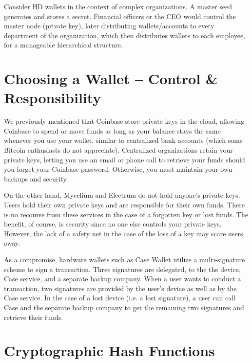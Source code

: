 \documentclass[11pt]{article}
\begin{document}
   Consider HD wallets in the context of complex organizations. A master seed generates and stores a secret. Financial officers or the CEO would control the master node (private key), later distributing wallets/accounts to every department of the organization, which then distributes wallets to each employee, for a manageable hierarchical structure.
   
   \section*{Choosing a Wallet -- Control \& Responsibility}
    
   We previously mentioned that Coinbase store private keys in the cloud, allowing Coinbase to spend or move funds as long as your balance stays the same whenever you use your wallet, similar to centralized bank accounts (which some Bitcoin enthusiasts do not appreciate). Centralized organizations retain your private keys, letting you use an email or phone call to retrieve your funds should you forget your Coinbase password. Otherwise, you must maintain your own backups and security.
   
   On the other hand, Mycelium and Electrum do not hold anyone's private keys. Users hold their own private keys and are responsible for their own funds. There is no recourse from these services in the case of a forgotten key or lost funds. The benefit, of course, is security since no one else controls your private keys. However, the lack of a safety net in the case of the loss of a key may scare users away.
   
   As a compromise, hardware wallets such as Case Wallet utilize a multi-signature scheme to sign a transaction. Three signatures are delegated, to the the device, Case service, and a separate backup company. When a user wants to conduct a transaction, two signatures are provided by the user's device as well as by the Case service. In the case of a lost device (i.e. a lost signature), a user can call Case and the separate backup company to get the remaining two signatures and retrieve their funds.
   
   
   \section*{Cryptographic Hash Functions}
   
\end{document}
